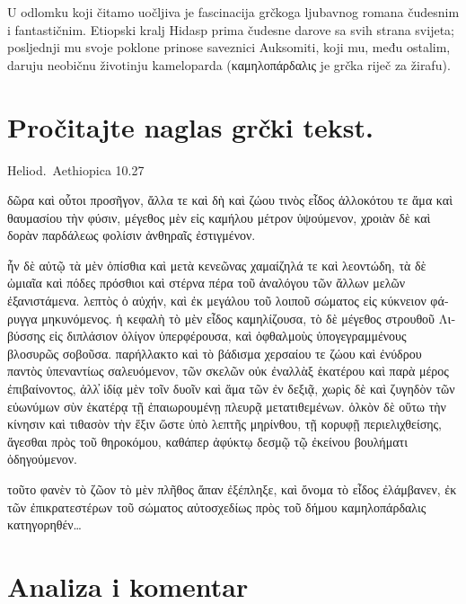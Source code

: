 U odlomku koji čitamo uočljiva je fascinacija grčkoga ljubavnog romana čudesnim i fantastičnim. Etiopski kralj Hidasp prima čudesne darove sa svih strana svijeta; posljednji mu svoje poklone prinose saveznici Auksomiti, koji mu, među ostalim, daruju neobičnu životinju kameloparda (\textgreek[variant=ancient]{καμηλοπάρδαλις} je grčka riječ za žirafu).




\section*{Pročitajte naglas grčki tekst.}

Heliod.\ Aethiopica 10.27

\medskip


{\large

\begin{greek}

\noindent δῶρα καὶ οὗτοι προσῆγον, ἄλλα τε καὶ δὴ καὶ ζώου τινὸς εἶδος ἀλλοκότου τε ἅμα καὶ θαυμασίου τὴν φύσιν, μέγεθος μὲν εἰς καμήλου μέτρον ὑψούμενον, χροιὰν δὲ καὶ δορὰν παρδάλεως φολίσιν ἀνθηραῖς ἐστιγμένον. 

\noindent ἦν δὲ αὐτῷ τὰ μὲν ὀπίσθια καὶ μετὰ κενεῶνας χαμαίζηλά τε καὶ λεοντώδη, τὰ δὲ ὠμιαῖα καὶ πόδες πρόσθιοι καὶ στέρνα πέρα τοῦ ἀναλόγου τῶν ἄλλων μελῶν ἐξανιστάμενα. λεπτὸς ὁ αὐχήν, καὶ ἐκ μεγάλου τοῦ λοιποῦ σώματος εἰς κύκνειον φάρυγγα μηκυνόμενος. ἡ κεφαλὴ τὸ μὲν εἶδος καμηλίζουσα, τὸ δὲ μέγεθος στρουθοῦ Λιβύσσης εἰς διπλάσιον ὀλίγον ὑπερφέρουσα, καὶ ὀφθαλμοὺς ὑπογεγραμμένους βλοσυρῶς σοβοῦσα. παρήλλακτο καὶ τὸ βάδισμα χερσαίου τε ζώου καὶ ἐνύδρου παντὸς ὑπεναντίως σαλευόμενον, τῶν σκελῶν οὐκ ἐναλλὰξ ἑκατέρου καὶ παρὰ μέρος ἐπιβαίνοντος, ἀλλ̓ ἰδίᾳ μὲν τοῖν δυοῖν καὶ ἅμα τῶν ἐν δεξιᾷ, χωρὶς δὲ καὶ ζυγηδὸν τῶν εὐωνύμων σὺν ἑκατέρᾳ τῇ ἐπαιωρουμένῃ πλευρᾷ μετατιθεμένων. ὁλκὸν δὲ οὕτω τὴν κίνησιν καὶ τιθασὸν τὴν ἕξιν ὥστε ὑπὸ λεπτῆς μηρίνθου, τῇ κορυφῇ περιελιχθείσης, ἄγεσθαι πρὸς τοῦ θηροκόμου, καθάπερ ἀφύκτῳ δεσμῷ τῷ ἐκείνου βουλήματι ὁδηγούμενον. 

\noindent τοῦτο φανὲν τὸ ζῶον τὸ μὲν πλῆθος ἅπαν ἐξέπληξε, καὶ ὄνομα τὸ εἶδος ἐλάμβανεν, ἐκ τῶν ἐπικρατεστέρων τοῦ σώματος αὐτοσχεδίως πρὸς τοῦ δήμου καμηλοπάρδαλις κατηγορηθέν\dots


\end{greek}

}


\section*{Analiza i komentar}

